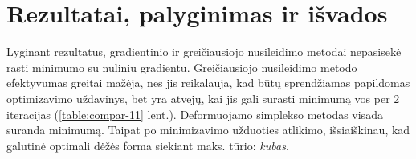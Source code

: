 \documentclass{VUMIFPSkursinis}
\begin{document}
\section{Rezultatai, palyginimas ir išvados}

Lyginant rezultatus, gradientinio ir greičiausiojo nusileidimo metodai nepasisekė rasti minimumo su nuliniu gradientu. Greičiausiojo nusileidimo metodo efektyvumas greitai mažėja, nes jis reikalauja,
kad būtų sprendžiamas papildomas optimizavimo uždavinys, bet yra atvejų, kai
jis gali surasti minimumą vos per 2 iteracijas (\ref{table:compar-11} lent.). Deformuojamo simplekso metodas visada suranda minimumą. Taipat po minimizavimo užduoties atlikimo, išsiaiškinau, kad galutinė optimali dėžės forma siekiant maks. tūrio: \textit{kubas}.

\begin{table}[H]
  \centering
  \caption{Rezultatų palyginimas taške $(0, 0)$.}
  \label{table:compar-00}
\end{table}

\begin{table}[H]
  \centering
  \caption{Rezultatų palyginimas taške $(1, 1)$.}
  \label{table:compar-11}
\end{table}
\end{document}
